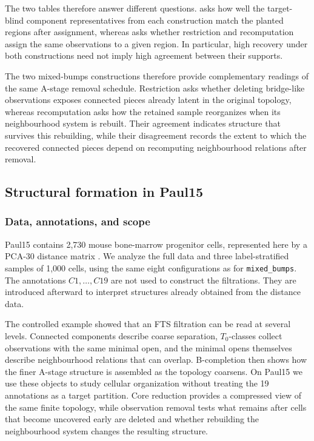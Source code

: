 \documentclass[a4paper,11pt]{article}
\theoremstyle{definition}
\theoremstyle{remark}
\begin{document}
The two tables therefore answer different questions.  asks how well the target-blind component representatives from each construction match the planted regions after assignment, whereas  asks whether restriction and recomputation assign the same observations to a given region. In particular, high recovery under both constructions need not imply high agreement between their supports.

The two mixed-bumps constructions therefore provide complementary readings of the same A-stage removal schedule. Restriction asks whether deleting bridge-like observations exposes connected pieces already latent in the original topology, whereas recomputation asks how the retained sample reorganizes when its neighbourhood system is rebuilt. Their agreement indicates structure that survives this rebuilding, while their disagreement records the extent to which the recovered connected pieces depend on recomputing neighbourhood relations after removal.

\subsection{Structural formation in Paul15}
\label{subsec:paul15}

\subsubsection*{Data, annotations, and scope}

Paul15 contains 2,730 mouse bone-marrow progenitor cells, represented here by a PCA-30 distance matrix \cite{Paul2015}. We analyze the full data and three label-stratified samples of 1,000 cells, using the same eight configurations as for \texttt{mixed\_bumps}. The annotations $C1,\ldots,C19$ are not used to construct the filtrations. They are introduced afterward to interpret structures already obtained from the distance data.

The controlled example showed that an FTS filtration can be read at several levels. Connected components describe coarse separation, $T_0$-classes collect observations with the same minimal open, and the minimal opens themselves describe neighbourhood relations that can overlap. B-completion then shows how the finer A-stage structure is assembled as the topology coarsens. On Paul15 we use these objects to study cellular organization without treating the 19 annotations as a target partition. Core reduction provides a compressed view of the same finite topology, while observation removal tests what remains after cells that become uncovered early are deleted and whether rebuilding the neighbourhood system changes the resulting structure.
\end{document}
